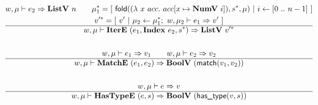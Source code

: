 \begin{gather*}
  w, \mu \vdash e_2 \Rightarrow \listv ~ n \qquad
  \seq{\mu_1} =
    [ ~
      \fold(
        (\lambda ~ x ~ acc. ~ acc[x \mapsto \numv ~ i]),
        \seq{s},
        \mu
      )
    ~ | ~
      i \leftarrow [0 ~ .. ~ n-1]
    ~ ]
  \\
  \seq{v'} =
    [ ~
      v'
    ~ | ~
      \mu_2 \leftarrow \seq {\mu_1}; ~ w, \mu_2 \vdash e_1 \Rightarrow v'
    ~ ] \\
  \hline
  w, \mu \vdash \itere ~ (e_1, \listidxiter ~ e_2, \seq{s}) \Rightarrow \listv ~ \seq{v'} \\
%
\newline \\
  w, \mu \vdash e_1 \Rightarrow v_1 \qquad
  w, \mu \vdash e_2 \Rightarrow v_2 \\
  \hline
  w, \mu \vdash \matche ~ (e_1, e_2) \Rightarrow \boolv ~ (\match(v_1, v_2)) \\
%
\newline \\
  w, \mu \vdash e \Rightarrow v \\
  \hline
  w, \mu \vdash \hastypee ~ (e, s) \Rightarrow \boolv ~ (\hastype(v, s)) \\
\end{gather*}

